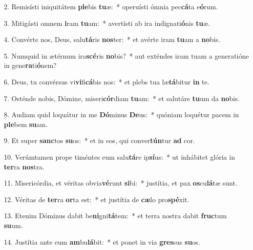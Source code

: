 2. Remisísti iniquitátem \textbf{ple}bis \textbf{tu}æ:~*  operuísti ómnia pec\textbf{cá}ta e\textbf{ó}rum.\

3. Mitigásti omnem \textbf{i}ram \textbf{tu}am:~*  avertísti ab ira indignati\textbf{ó}nis \textbf{tu}æ.\

4. Convérte nos, Deus, salu\textbf{tá}ris \textbf{nos}ter:~*  et avérte iram \textbf{tu}am a \textbf{no}bis.\

5. Numquid in ætérnum ira\textbf{scé}ris \textbf{no}bis?~*  aut exténdes iram tuam a generatióne in gene\textbf{ra}ti\textbf{ó}nem?\

6. Deus, tu convérsus vi\textbf{vi}fi\textbf{cá}bis nos:~*  et plebs tua læ\textbf{tá}bitur \textbf{in} te.\

7. Osténde nobis, Dómine, miseri\textbf{cór}diam \textbf{tu}am:~*  et salutáre \textbf{tu}um da \textbf{no}bis.\

8. Audiam quid loquátur in me \textbf{Dó}minus \textbf{De}us:~*  quóniam loquétur pacem in \textbf{ple}bem \textbf{su}am.\

9. Et super \textbf{sanc}tos \textbf{su}os:~*  et in eos, qui conver\textbf{tún}tur \textbf{ad} cor.\

10. Verúmtamen prope timéntes eum salu\textbf{tá}re ip\textbf{sí}us:~*  ut inhábitet glória in \textbf{ter}ra \textbf{nos}tra.\

11. Misericórdia, et véritas obvia\textbf{vé}runt \textbf{si}bi:~*  justítia, et pax \textbf{os}cu\textbf{lá}tæ sunt.\

12. Véritas de \textbf{ter}ra \textbf{or}ta est:~*  et justítia de \textbf{cæ}lo pro\textbf{spé}xit.\

13. Etenim Dóminus dabit be\textbf{ni}gni\textbf{tá}tem:~*  et terra nostra dabit \textbf{fruc}tum \textbf{su}um.\

14. Justítia ante eum \textbf{am}bu\textbf{lá}bit:~*  et ponet in via \textbf{gres}sus \textbf{su}os.\

